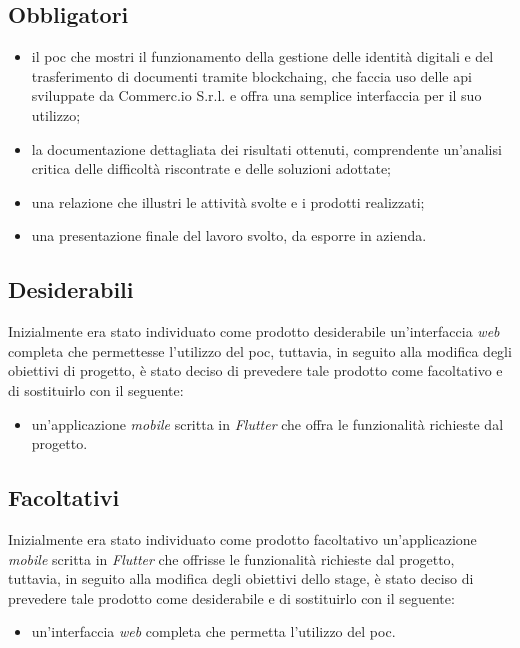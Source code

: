 \subsection*{Obbligatori}
\begin{itemize}
	\item il \gls{poc} che mostri il funzionamento della gestione delle identità digitali e del trasferimento di documenti tramite \gls{blockchaing}, che faccia uso delle \gls{api} sviluppate da Commerc.io S.r.l. e offra una semplice interfaccia per il suo utilizzo;
	\item la documentazione dettagliata dei risultati ottenuti, comprendente un'analisi critica delle difficoltà riscontrate e delle soluzioni adottate;
	\item una relazione che illustri le attività svolte e i prodotti realizzati;
	\item una presentazione finale del lavoro svolto, da esporre in azienda.
\end{itemize}

\subsection*{Desiderabili}

Inizialmente era stato individuato come prodotto desiderabile un'interfaccia \textit{web} completa che permettesse l'utilizzo del \gls{poc}, tuttavia, in seguito alla modifica degli obiettivi di progetto, è stato deciso di prevedere tale prodotto come facoltativo e di sostituirlo con il seguente:

\begin{itemize}
	\item un'applicazione \textit{mobile} scritta in \textit{Flutter} che offra le funzionalità richieste dal progetto.
\end{itemize}

\subsection*{Facoltativi}

Inizialmente era stato individuato come prodotto facoltativo un'applicazione \textit{mobile} scritta in \textit{Flutter} che offrisse le funzionalità richieste dal progetto, tuttavia, in seguito alla modifica degli obiettivi dello stage, è stato deciso di prevedere tale prodotto come desiderabile e di sostituirlo con il seguente:

\begin{itemize}
	\item un'interfaccia \textit{web} completa che permetta l'utilizzo del \gls{poc}.
\end{itemize} 

